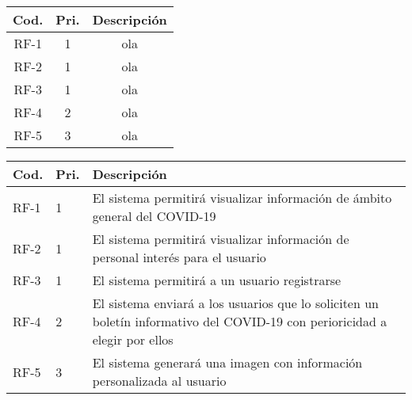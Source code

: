 \documentclass{article}
\begin{document}
\begin{table}[H]
    \centering
    \begin{tabular}{| c | c | c |}
        \hline
        Cod.   &    Pri.   &  Descripción  \\ \hline
        RF-1   &     1     & ola \\ \hline
        RF-2   &     1     & ola \\ \hline
        RF-3   &     1     & ola \\ \hline
        RF-4   &     2     & ola \\ \hline
        RF-5   &     3     & ola \\ \hline
    \end{tabular}
\end{table}

\begin{table}[H]
    \centering
    \begin{tabular}{|p{10mm}|p{5mm}|p{100mm}|}
        \hline
        Cod.   &    Pri.   &  Descripción  \\ \hline
        RF-1   &     1     &  El sistema permitirá visualizar información  de  ámbito general del COVID-19  \\ \hline
        RF-2   &     1     &  El sistema permitirá visualizar información  de personal interés para el usuario  \\ \hline
        RF-3   &     1     &  El sistema permitirá a un usuario registrarse  \\ \hline
        RF-4   &     2     &  El sistema enviará a los usuarios que lo  soliciten un boletín informativo del COVID-19 con perioricidad a elegir por ellos \\ \hline
        RF-5   &     3     &  El sistema generará una imagen con información  personalizada al usuario  \\ \hline
    \end{tabular}
\end{table}
\end{document}
